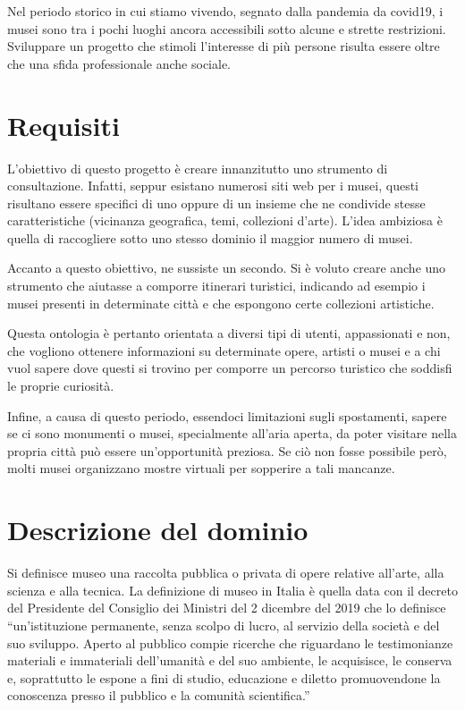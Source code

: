 \documentclass[12pt]{article}
\begin{document}
Nel periodo storico in cui stiamo vivendo, segnato dalla pandemia da covid19, i musei sono tra i pochi luoghi ancora accessibili sotto alcune e strette restrizioni. Sviluppare un progetto che stimoli l’interesse di più persone risulta essere oltre che una sfida professionale anche sociale.
\section{Requisiti}
L’obiettivo di questo progetto è creare innanzitutto uno strumento di consultazione. Infatti, seppur esistano numerosi siti web per i musei, questi risultano essere specifici di uno oppure di un insieme che ne condivide stesse caratteristiche (vicinanza geografica, temi, collezioni d’arte). 
L’idea ambiziosa è quella di raccogliere sotto uno stesso dominio il maggior numero di musei.

Accanto a questo obiettivo, ne sussiste un secondo. Si è voluto creare anche uno strumento che aiutasse a comporre itinerari turistici, indicando ad esempio i musei presenti in determinate città e che espongono certe collezioni artistiche.

Questa ontologia è pertanto orientata a diversi tipi di utenti, appassionati e non, che vogliono ottenere informazioni su determinate opere, artisti o musei e a chi vuol sapere dove questi si trovino per comporre un percorso turistico che soddisfi le proprie curiosità.

Infine, a causa di questo periodo, essendoci limitazioni sugli spostamenti, sapere se ci sono monumenti o musei, specialmente all’aria aperta, da poter visitare nella propria città può essere un’opportunità preziosa. Se ciò non fosse possibile però, molti musei organizzano mostre virtuali per sopperire a tali mancanze.
\newpage
\section{Descrizione del dominio}
Si definisce museo una raccolta pubblica o privata di opere relative all’arte, alla scienza e alla tecnica. La definizione di museo in Italia è quella data con il decreto del Presidente del Consiglio dei Ministri del 2 dicembre del 2019 che lo definisce “un’istituzione permanente, senza scolpo di lucro, al servizio della società e del suo sviluppo. Aperto al pubblico compie ricerche che riguardano le testimonianze materiali e immateriali dell’umanità e del suo ambiente, le acquisisce, le conserva e, soprattutto le espone a fini di studio, educazione e diletto promuovendone la conoscenza presso il pubblico e la comunità scientifica.” \parencite{def1}
\end{document}
